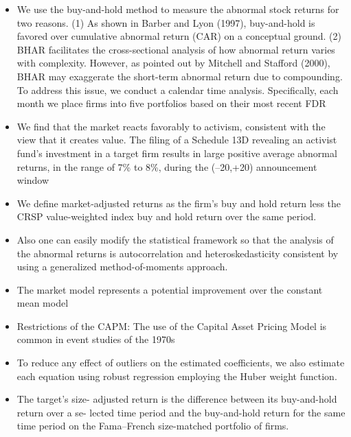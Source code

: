 \documentclass[12pt]{article}
\begin{document}
    \begin{itemize}

        \item We use the buy-and-hold method to measure the abnormal stock returns for two reasons. (1) As shown in Barber and Lyon (1997), buy-and-hold is favored over cumulative abnormal return (CAR) on a conceptual ground. (2) BHAR facilitates the cross-sectional analysis of how abnormal return varies with complexity. However, as pointed out by Mitchell and Stafford (2000), BHAR may exaggerate the short-term abnormal return due to compounding. To address this issue, we conduct a calendar time analysis. Specifically, each month we place firms into five portfolios based on their most recent FDR \citep{You2009}

        \item We find that the market reacts favorably to activism, consistent with the view that it creates value. The filing of a Schedule 13D revealing an activist fund’s investment in a target firm results in large positive average abnormal returns, in the range
        of 7\% to 8\%, during the (–20,+20) announcement window \citep{Brav2008}

        \item We define market-adjusted returns as the firm’s buy and hold return less the CRSP value-weighted index buy and hold return over the same period. \citep{Choi2012}

        \item Also one can easily modify the statistical framework so that the analysis of the abnormal returns is autocorrelation and heteroskedasticity consistent by using a generalized method-of-moments approach.\citep{MacKinlay1997}

        \item The market model represents a potential improvement over the constant mean model \citep{MacKinlay1997}

        \item Restrictions of the CAPM: The use of the Capital Asset Pricing Model is common in event studies of the 1970s \citep{MacKinlay1997} 

        \item To reduce any effect of outliers on the estimated coefficients, we also estimate each equation using robust regression employing the Huber weight function. \citep{Brigida2012}

        \item The target’s size- adjusted return is the difference between its buy-and-hold return over a se- lected time period and the buy-and-hold return for the same time period on the Fama–French size-matched portfolio of firms. 
        

\end{itemize}
\end{document}
